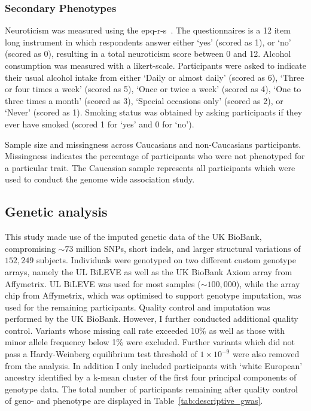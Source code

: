 \subsubsection{Secondary Phenotypes}
\label{ssub:sec_pheno}

Neuroticism was measured using the \acrfull{epq-r-s}~\cite{Eysenck1985}. 
The questionnaires is a 12 item long instrument in which respondents answer either `yes' (scored as 1), or `no' (scored as 0),
resulting in a total neuroticism score between 0 and 12.
Alcohol consumption was measured with a likert-scale.
Participants were asked to indicate their usual alcohol intake from either `Daily or almost daily' (scored as 6), `Three or four times a week' (scored as 5), `Once or twice a week' (scored as 4), `One to three times a month' (scored as 3), `Special occasions only' (scored as 2), or `Never' (scored as 1).
Smoking status was obtained by asking participants if they ever have smoked (scored 1 for `yes' and 0 for `no').


\begin{table}[!htpb]
	\centering
	\resizebox{\textwidth}{!}{}
  \caption[Sample Size and Missingness of UK BioBank]{
    Sample size and missingness across Caucasians and non-Caucasians participants.
    Missingness indicates the percentage of participants who were not phenotyped for a particular trait.
    The Caucasian sample represents all participants which were used to conduct the genome wide association study.
}\label{tab:descriptive_gwas} 
\end{table}

\subsection{Genetic analysis}
\label{sub:genetic_analysis}
This study made use of the imputed genetic data of the UK BioBank, compromising $\sim73$ million SNPs, short indels, and larger structural variations of $152,249$ subjects.
Individuals were genotyped on two different custom genotype arrays, namely the UL BiLEVE as well as the UK BioBank Axiom array from Affymetrix. 
UL BiLEVE was used for most samples ($\sim100,000$), while the array chip from Affymetrix, which was optimised to support genotype imputation, was used for the remaining participants. 
Quality control and imputation was performed by the UK BioBank.
However, I further conducted additional quality control.
Variants whose missing call rate exceeded 10\% as well as those with minor allele frequency below 1\% were excluded.
Further variants which did not pass a Hardy-Weinberg equilibrium test threshold of $1\times10^{-9}$ were also removed from the analysis.
In addition I only included participants with `white European' ancestry identified by a k-mean cluster of the first four principal components of genotype data.
The total number of participants remaining after quality control of geno- and phenotype are displayed in Table~\ref{tab:descriptive_gwas}.


